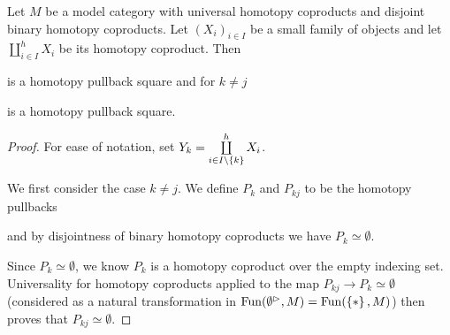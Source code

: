 \begin{corollary}\label{cor:genCoproductComponentPb}
    Let $M$ be a model category with universal homotopy coproducts and disjoint binary homotopy coproducts.
    Let $\left(X_i\right)_{i\in I}$ be a small family of objects and let $\coprod\limits_{i\in I}^h X_i$ be its homotopy coproduct.
    Then
    \begin{center}
    \end{center}
    is a homotopy pullback square and for $k\neq j$
    \begin{center}
    \end{center}
    is a homotopy pullback square.
    \begin{proof}
        For ease of notation, set $Y_k=\coprod\limits_{i\in I\setminus{\left\lbrace k\right\rbrace}}^hX_i$.

        We first consider the case $k\neq j$.
        We define $P_k$ and $P_{kj}$ to be the homotopy pullbacks 
        \begin{center}
        \end{center}
        and by disjointness of binary homotopy coproducts we have $P_k\simeq\emptyset$.

        Since $P_k\simeq\emptyset$, we know $P_k$ is a homotopy coproduct over the empty indexing set. 
        Universality for homotopy coproducts applied to the map $P_{kj}\to P_k\simeq\emptyset$ (considered as a natural transformation in $\operatorname{Fun}(\emptyset^{\rhd},M)=\operatorname{Fun}(\left\lbrace*\right\rbrace,M)$) then proves that $P_{kj}\simeq\emptyset$.


\end{proof}
\end{corollary}

